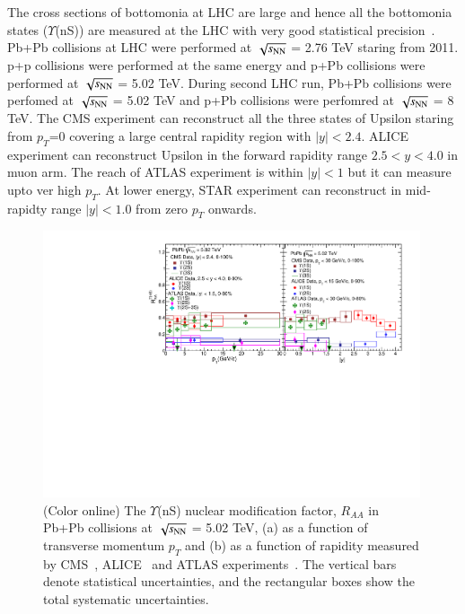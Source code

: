 The cross sections of bottomonia at LHC are large and hence all the 
bottomonia states ($\Upsilon$(nS)) are measured at the LHC with very good statistical
precision~\cite{Chatrchyan:2011pe,Chatrchyan:2012lxa,Abelev:2014nua,Khachatryan:2016xxp}.
 Pb+Pb collisions at LHC were performed at $\sqrt{s_{\rm NN}}$ = 2.76 TeV staring from 
2011. p+p collisions were performed at the same energy and p+Pb collisions were performed
at $\sqrt{s_{\rm NN}}$ = 5.02 TeV. 
During second LHC run, Pb+Pb collisions were perfomed at $\sqrt{s_{\rm NN}}$ = 5.02 TeV 
and p+Pb collisions were perfomred at $\sqrt{s_{\rm NN}}$ = 8 TeV. 
The CMS experiment can reconstruct all the three states of Upsilon staring from
$p_T$=0 covering a large central rapidity region with $|y| < 2.4$.
ALICE experiment can reconstruct Upsilon in the forward rapidity range
$2.5 < y < 4.0$ in muon arm.
The reach of ATLAS experiment is within $|y| < 1$ but it can measure upto ver high $p_T$.
At lower energy, STAR experiment can reconstruct in mid-rapidty range
$|y| < 1.0$ from zero $p_T$ onwards. 

\begin{figure}
  \includegraphics[width=0.99\textwidth]{Figures/Fig5_LHC_YnSRAAPtRap.pdf}
  \caption{(Color online) The $\Upsilon$(nS) nuclear modification factor, $R_{AA}$
in Pb+Pb collisions at $\sqrt{s_{\rm NN}}$ = 5.02 TeV, (a) as a function of transverse momentum $p_{T}$
    and (b) as a function of rapidity measured by CMS~\cite{CMS:2018zza}, ALICE~\cite{ALICE:2020wwx}
    and ATLAS experiments~\cite{ALICE:2020wwx}.
    The vertical bars denote statistical uncertainties, and the rectangular boxes
    show the total systematic uncertainties.
  }
  \label{fig:LHCYnSRAAPtRap}
\end{figure}


